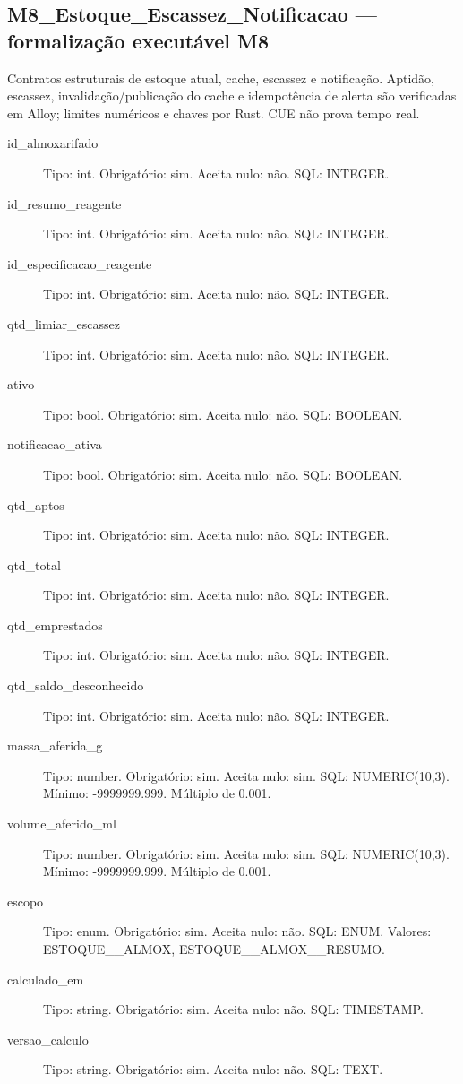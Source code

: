 \subsection*{M8\_Estoque\_Escassez\_Notificacao --- formalização executável M8}
Contratos estruturais de estoque atual, cache, escassez e notificação. Aptidão, escassez, invalidação/publicação do cache e idempotência de alerta são verificadas em Alloy; limites numéricos e chaves por Rust. CUE não prova tempo real.
\begin{description}
\item[id\_almoxarifado] Tipo: int. Obrigatório: sim. Aceita nulo: não.
SQL: INTEGER.
\item[id\_resumo\_reagente] Tipo: int. Obrigatório: sim. Aceita nulo: não.
SQL: INTEGER.
\item[id\_especificacao\_reagente] Tipo: int. Obrigatório: sim. Aceita nulo: não.
SQL: INTEGER.
\item[qtd\_limiar\_escassez] Tipo: int. Obrigatório: sim. Aceita nulo: não.
SQL: INTEGER.
\item[ativo] Tipo: bool. Obrigatório: sim. Aceita nulo: não.
SQL: BOOLEAN.
\item[notificacao\_ativa] Tipo: bool. Obrigatório: sim. Aceita nulo: não.
SQL: BOOLEAN.
\item[qtd\_aptos] Tipo: int. Obrigatório: sim. Aceita nulo: não.
SQL: INTEGER.
\item[qtd\_total] Tipo: int. Obrigatório: sim. Aceita nulo: não.
SQL: INTEGER.
\item[qtd\_emprestados] Tipo: int. Obrigatório: sim. Aceita nulo: não.
SQL: INTEGER.
\item[qtd\_saldo\_desconhecido] Tipo: int. Obrigatório: sim. Aceita nulo: não.
SQL: INTEGER.
\item[massa\_aferida\_g] Tipo: number. Obrigatório: sim. Aceita nulo: sim.
SQL: NUMERIC(10,3).
Mínimo: -9999999.999.
Múltiplo de 0.001.
\item[volume\_aferido\_ml] Tipo: number. Obrigatório: sim. Aceita nulo: sim.
SQL: NUMERIC(10,3).
Mínimo: -9999999.999.
Múltiplo de 0.001.
\item[escopo] Tipo: enum. Obrigatório: sim. Aceita nulo: não.
SQL: ENUM.
Valores: ESTOQUE\_\_ALMOX, ESTOQUE\_\_ALMOX\_\_RESUMO.
\item[calculado\_em] Tipo: string. Obrigatório: sim. Aceita nulo: não.
SQL: TIMESTAMP.
\item[versao\_calculo] Tipo: string. Obrigatório: sim. Aceita nulo: não.
SQL: TEXT.

\end{description}
